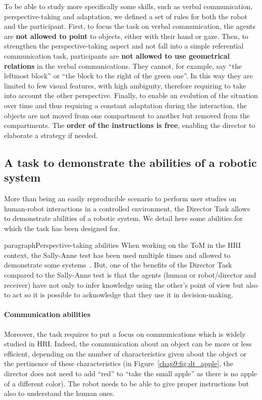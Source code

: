 \documentclass[a4paper,11pt,twoside]{StyleThese}
\begin{document}
To be able to study more specifically some skills, such as verbal communication, perspective-taking and adaptation, we defined a set of rules for both the robot and the participant. First, to focus the task on verbal communication, the agents are \textbf{not allowed to point} to objects, either with their hand or gaze. Then, to strengthen the perspective-taking aspect and not fall into a simple referential communication task, participants are \textbf{not allowed to use geometrical relations} in the verbal communications. They cannot, for example, say ``the leftmost block'' or ``the block to the right of the green one''. In this way they are limited to few visual features, with high ambiguity, therefore requiring to take into account the other perspective. Finally, to enable an evolution of the situation over time and thus requiring a constant adaptation during the interaction, the objects are not moved from one compartment to another but removed from the compartments. The \textbf{order of the instructions is free}, enabling the director to elaborate a strategy if needed.

\subsection{A task to demonstrate the abilities of a robotic system}\label{subsec:abilities}

More than being an easily reproducible scenario to perform user studies on human-robot interactions in a controlled environment, the Director Task allows to demonstrate abilities of a robotic system. We detail here some abilities for which the task has been designed for.

paragraph{Perspective-taking abilities} When working on the ToM in the HRI context, the Sally-Anne test has been used multiple times and allowed to demonstrate some systems~\cite{milliez_2014_framework}. But, one of the benefits of the Director Task compared to the Sally-Anne test is that the agents (human or robot/director and receiver) have not only to infer knowledge using the other's point of view but also to act so it is possible to acknowledge that they use it in decision-making. 

\paragraph{Communication abilities} Moreover, the task 
requires to put a focus on communications which is widely studied in HRI. Indeed, the communication about an object can be more or less efficient, depending on the number of characteristics given about the object or the pertinence of these characteristics (\eg in Figure~\ref{chap9:fig:dt_apple}, the director does not need to add ``red'' to ``take the small apple'' as there is no apple of a different color). The robot needs to be able to give proper instructions but also to understand the human ones.
\end{document}
